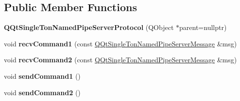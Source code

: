 \subsection*{Public Member Functions}
\begin{DoxyCompactItemize}
\item 
\mbox{\label{class_q_qt_single_ton_named_pipe_server_protocol_af5dccef8a71e32972585a18c851b7484}} 
{\bfseries Q\+Qt\+Single\+Ton\+Named\+Pipe\+Server\+Protocol} (Q\+Object $\ast$parent=nullptr)
\item 
\mbox{\label{class_q_qt_single_ton_named_pipe_server_protocol_ab0cffaccd12bff5057917f17386c2d8d}} 
void {\bfseries recv\+Command1} (const \mbox{\hyperlink{class_q_qt_single_ton_named_pipe_server_message}{Q\+Qt\+Single\+Ton\+Named\+Pipe\+Server\+Message}} \&msg)
\item 
\mbox{\label{class_q_qt_single_ton_named_pipe_server_protocol_a406ebfd76615729e14ab2041c33d938a}} 
void {\bfseries recv\+Command2} (const \mbox{\hyperlink{class_q_qt_single_ton_named_pipe_server_message}{Q\+Qt\+Single\+Ton\+Named\+Pipe\+Server\+Message}} \&msg)
\item 
\mbox{\label{class_q_qt_single_ton_named_pipe_server_protocol_ace9a357fcec39ed2cf8fbd62d1fddbc9}} 
void {\bfseries send\+Command1} ()
\item 
\mbox{\label{class_q_qt_single_ton_named_pipe_server_protocol_ad517803b23f66567b4eae5099c9ccc41}} 
void {\bfseries send\+Command2} ()
\end{DoxyCompactItemize}
